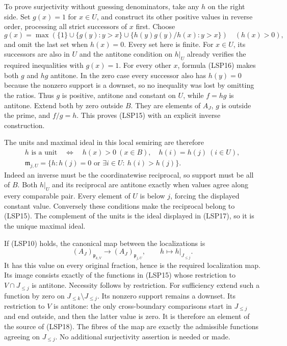 To prove surjectivity without guessing denominators, take any $h$
on the right side. Set $g(x)=1$ for $x\in U$, and construct its
other positive values in reverse order, processing all strict
successors of $x$ first. Choose
\begin{equation}\tag{LSP16}
 g(x)=\max\left(\{1\}\cup\{g(y):y>x\}
  \cup\{h(y)g(y)/h(x):y>x\}\right)\quad(h(x)>0),
\end{equation}
and omit the last set when $h(x)=0$. Every set here is finite.
For $x\in U$, its successors are also in $U$ and the antitone
condition on $h|_U$ already verifies the required inequalities with
$g(x)=1$. For every other $x$, formula (LSP16) makes both $g$ and
$hg$ antitone. In the zero case every successor also has $h(y)=0$
because the nonzero support is a downset, so no inequality was
lost by omitting the ratios. Thus $g$ is positive, antitone and
constant on $U$, while $f=hg$ is antitone. Extend both by zero
outside $B$. They are elements of $A_J$, $g$ is outside the prime,
and $f/g=h$. This proves (LSP15) with an explicit inverse construction.

The units and maximal ideal in this local semiring are therefore
\begin{equation}\tag{LSP17}
 \begin{gathered}
 h\text{ is a unit}\quad\Longleftrightarrow\quad
 h(x)>0\ (x\in B),\quad h(i)=h(j)\ (i\in U),\\
 \mathfrak m_{j,U}=\{h:h(j)=0\text{ or }
                         \exists i\in U:\ h(i)>h(j)\}.
 \end{gathered}
\end{equation}
Indeed an inverse must be the coordinatewise reciprocal, so support
must be all of $B$. Both $h|_U$ and its reciprocal are antitone
exactly when values agree along every comparable pair. Every element
of $U$ is below $j$, forcing the displayed constant value. Conversely
these conditions make the reciprocal belong to (LSP15). The
complement of the units is the ideal displayed in (LSP17), so it is
the unique maximal ideal.

If (LSP10) holds, the canonical map between the localizations is
\begin{equation}\tag{LSP18}
 (A_J)_{\mathfrak p_{k,V}}\longrightarrow
 (A_J)_{\mathfrak p_{j,U}},\qquad
 h\longmapsto h|_{J_{\le j}}.
\end{equation}
It has this value on every original fraction, hence is the required
localization map. Its image consists exactly of the functions in
(LSP15) whose restriction to $V\cap J_{\le j}$ is antitone.
Necessity follows by restriction. For sufficiency extend such a
function by zero on $J_{\le k}\setminus J_{\le j}$. Its nonzero
support remains a downset. Its restriction to $V$ is antitone:
the only cross-boundary comparisons start in $J_{\le j}$ and end
outside, and then the latter value is zero. It is therefore an
element of the source of (LSP18). The fibres of the map are exactly
the admissible functions agreeing on $J_{\le j}$. No additional
surjectivity assertion is needed or made.

